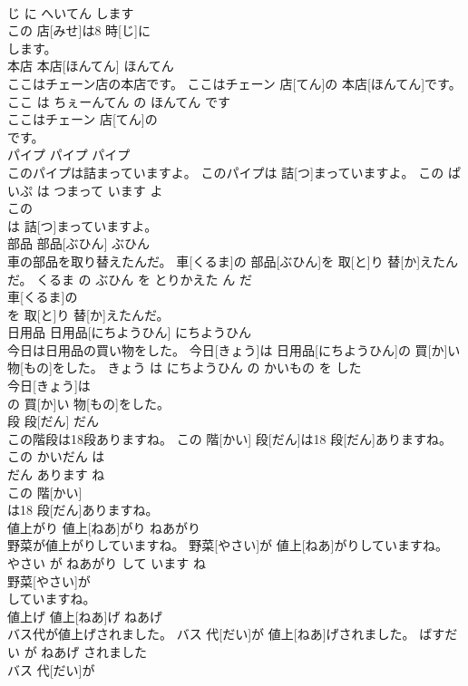 \documentclass[8pt]{extreport}
\begin{document}
\begin{CJK}{UTF8}{min}
\\	じ に へいてん します	
\\	この 店[みせ]は8 時[じ]に
\\	します。			
\\	本店	本店[ほんてん]	ほんてん	
\\	ここはチェーン店の本店です。	ここはチェーン 店[てん]の 本店[ほんてん]です。	ここ は ちぇーんてん の ほんてん です	
\\	ここはチェーン 店[てん]の
\\	です。			
\\	パイプ	パイプ	パイプ	
\\	このパイプは詰まっていますよ。	このパイプは 詰[つ]まっていますよ。	この ぱいぷ は つまって います よ	
\\	この
\\	は 詰[つ]まっていますよ。			
\\	部品	部品[ぶひん]	ぶひん	
\\	車の部品を取り替えたんだ。	車[くるま]の 部品[ぶひん]を 取[と]り 替[か]えたんだ。	くるま の ぶひん を とりかえた ん だ	
\\	車[くるま]の
\\	を 取[と]り 替[か]えたんだ。			
\\	日用品	日用品[にちようひん]	にちようひん	
\\	今日は日用品の買い物をした。	今日[きょう]は 日用品[にちようひん]の 買[か]い 物[もの]をした。	きょう は にちようひん の かいもの を した	
\\	今日[きょう]は
\\	の 買[か]い 物[もの]をした。			
\\	段	段[だん]	だん	
\\	この階段は18段ありますね。	この 階[かい] 段[だん]は18 段[だん]ありますね。	この かいだん は 
\\	だん あります ね	
\\	この 階[かい]
\\	は18 段[だん]ありますね。			
\\	値上がり	値上[ねあ]がり	ねあがり	
\\	野菜が値上がりしていますね。	野菜[やさい]が 値上[ねあ]がりしていますね。	やさい が ねあがり して います ね	
\\	野菜[やさい]が
\\	していますね。			
\\	値上げ	値上[ねあ]げ	ねあげ	
\\	バス代が値上げされました。	バス 代[だい]が 値上[ねあ]げされました。	ばすだい が ねあげ されました	
\\	バス 代[だい]が

\end{CJK}
\end{document}

